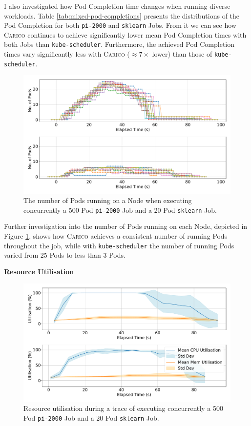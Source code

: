I also investigated how Pod Completion time changes when running diverse
workloads. Table \ref{tab:mixed-pod-completions} presents the distributions of
the Pod Completion for both \texttt{pi-2000} and \texttt{sklearn} Jobs. From it
we can see how \textsc{Carico} continues to achieve significantly lower mean Pod
Completion times with both Jobs than \texttt{kube-scheduler}. Furthermore, the
achieved Pod Completion times vary significantly less with \textsc{Carico}
($\approx 7 \times$ lower) than those of \texttt{kube-scheduler}.

\begin{figure}[ht!]
    \centering
    \includegraphics[width=\textwidth]{images/mixed-running-pods.pdf}
    \caption{The number of Pods running on a Node when executing concurrently a
    500 Pod \texttt{pi-2000} Job and a 20 Pod \texttt{sklearn} Job.}
    \label{fig:mixed-pod-running}
\end{figure}

Further investigation into the number of Pods running on each Node, depicted in
Figure \ref{fig:mixed-pod-running}, shows how \textsc{Carico} achieves a
consistent number of running Pods throughout the job, while with
\texttt{kube-scheduler} the number of running Pods varied from 25 Pods to less
than 3 Pods.

\textbf{Resource Utilisation}\\
\begin{figure}[ht!]
    \centering
    \includegraphics[width=\textwidth]{images/mixed-util.pdf}
    \caption{Resource utilisation during a trace of executing concurrently a 500
    Pod \texttt{pi-2000} Job and a 20 Pod \texttt{sklearn} Job.}
    \label{fig:mixed-util}
\end{figure}

